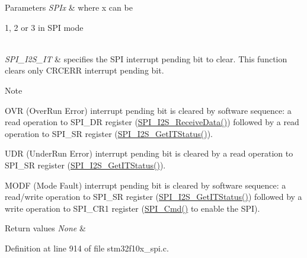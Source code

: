 \begin{DoxyParams}{Parameters}
{\em S\+P\+Ix} & where x can be
\begin{DoxyItemize}
\item 1, 2 or 3 in S\+PI mode 
\end{DoxyItemize}\\
\hline
{\em S\+P\+I\+\_\+\+I2\+S\+\_\+\+IT} & specifies the S\+PI interrupt pending bit to clear. This function clears only C\+R\+C\+E\+RR interrupt pending bit. \\
\hline
\end{DoxyParams}
\begin{DoxyNote}{Note}

\begin{DoxyItemize}
\item O\+VR (Over\+Run Error) interrupt pending bit is cleared by software sequence\+: a read operation to S\+P\+I\+\_\+\+DR register (\hyperlink{group___s_p_i___private___functions_gab77de76547f3bff403236b263b070a30}{S\+P\+I\+\_\+\+I2\+S\+\_\+\+Receive\+Data()}) followed by a read operation to S\+P\+I\+\_\+\+SR register (\hyperlink{group___s_p_i___private___functions_ga72decbc1cd79f8fad92a2204beca6bc5}{S\+P\+I\+\_\+\+I2\+S\+\_\+\+Get\+I\+T\+Status()}).
\item U\+DR (Under\+Run Error) interrupt pending bit is cleared by a read operation to S\+P\+I\+\_\+\+SR register (\hyperlink{group___s_p_i___private___functions_ga72decbc1cd79f8fad92a2204beca6bc5}{S\+P\+I\+\_\+\+I2\+S\+\_\+\+Get\+I\+T\+Status()}).
\item M\+O\+DF (Mode Fault) interrupt pending bit is cleared by software sequence\+: a read/write operation to S\+P\+I\+\_\+\+SR register (\hyperlink{group___s_p_i___private___functions_ga72decbc1cd79f8fad92a2204beca6bc5}{S\+P\+I\+\_\+\+I2\+S\+\_\+\+Get\+I\+T\+Status()}) followed by a write operation to S\+P\+I\+\_\+\+C\+R1 register (\hyperlink{group___s_p_i___private___functions_gaa31357879a65ee1ed7223f3b9114dcf3}{S\+P\+I\+\_\+\+Cmd()} to enable the S\+PI). 
\end{DoxyItemize}
\end{DoxyNote}

\begin{DoxyRetVals}{Return values}
{\em None} & \\
\hline
\end{DoxyRetVals}


Definition at line 914 of file stm32f10x\+\_\+spi.\+c.

\mbox{\label{group___s_p_i___exported___functions_gabe36880945fa56785283a9c0092124cc}} 
